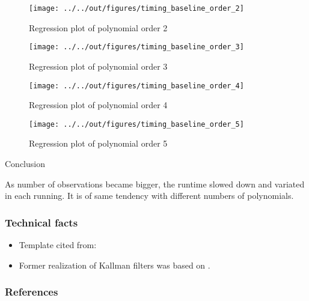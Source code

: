 \documentclass[11pt]{beamer}
\begin{document}
\begin{frame}
        \begin{figure}
    \caption{Regression plot of polynomial order 2}
    \texttt{[image: ../../out/figures/timing\_baseline\_order\_2]}
        \end{figure}
\end{frame}


\begin{frame}
        \begin{figure}
    \caption{Regression plot of polynomial order 3}
    \texttt{[image: ../../out/figures/timing\_baseline\_order\_3]}
        \end{figure}
\end{frame}


\begin{frame}
        \begin{figure}
    \caption{Regression plot of polynomial order 4}
    \texttt{[image: ../../out/figures/timing\_baseline\_order\_4]}
        \end{figure}
\end{frame}


\begin{frame}
        \begin{figure}
    \caption{Regression plot of polynomial order 5}
    \texttt{[image: ../../out/figures/timing\_baseline\_order\_5]}
        \end{figure}
\end{frame}


\begin{frame}
Conclusion
\end{frame}


\begin{frame}
        As number of observations became bigger, the runtime slowed down and variated in each running. It is of same tendency with different numbers of polynomials.
\end{frame}


\begin{frame}[t]
    \frametitle{Technical facts}
    \begin{itemize}
        \item<+-> Template cited from: \citet{GaudeckerEconProjectTemplates}
        \item<+-> Former realization of Kallman filters was based on \citet{Gabler18}.
    \end{itemize}
    \note{~}
\end{frame}


 {
    \begin{frame}
        \frametitle{}
    \end{frame}

}

\begin{frame}[allowframebreaks]
    \frametitle{References}
    
    
    
\end{frame}
\end{document}
